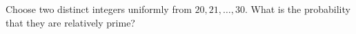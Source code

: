 Choose two distinct integers uniformly from $20,21,\ldots,30$. What is the probability that they are relatively prime?
